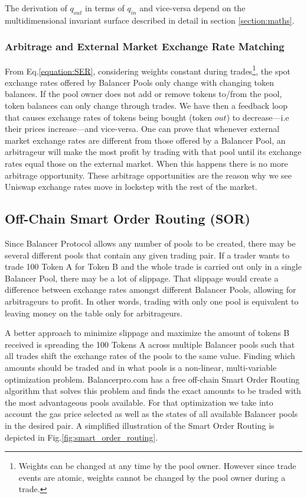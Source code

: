 \documentclass[11pt]{amsart}
\begin{document}
The derivation of $q_{out}$ in terms of $q_{in}$ and vice-versa depend on the multidimensional invariant surface described in detail in section \ref{section:maths}.

\subsubsection{Arbitrage and External Market Exchange Rate Matching}
From Eq.\ref{equation:SER}, considering weights constant during trades\footnote{Weights can be changed at any time by the pool owner. However since trade events are atomic, weights cannot be changed by the pool owner during a trade.}, the spot exchange rates offered by Balancer Pools only change with changing token balances. If the pool owner does not add or remove tokens to/from the pool, token balances can only change through trades. We have then a feedback loop that causes exchange rates of tokens being bought (token $out$) to decrease---i.e their prices increase---and vice-versa. One can prove that whenever external market exchange rates are different from those offered by a Balancer Pool, an arbitrageur will make the most profit by trading with that pool until its exchange rates equal those on the external market. When this happens there is no more arbitrage opportunity. These arbitrage opportunities are the reason why we see Uniswap exchange rates move in lockstep with the rest of the market. 

\subsection{Off-Chain Smart Order Routing (SOR)}
Since Balancer Protocol allows any number of pools to be created, there may be several different pools that contain any given trading pair. If a trader wants to trade 100 Token A for Token B and the whole trade is carried out only in a single Balancer Pool, there may be a lot of slippage. That slippage would create a difference between exchange rates amongst different Balancer Pools, allowing for arbitrageurs to profit. In other words, trading with only one pool is equivalent to leaving money on the table only for arbitrageurs. 

A better approach to minimize slippage and maximize the amount of tokens B received is spreading the 100 Tokens A across multiple Balancer pools such that all trades shift the exchange rates of the pools to the same value. Finding which amounts should be traded and in what pools is a non-linear, multi-variable optimization problem. Balancerpro.com has a free off-chain Smart Order Routing algorithm that solves this problem and finds the exact amounts to be traded with the most advantageous pools available. For that optimization we take into account the gas price selected as well as the states of all available Balancer pools in the desired pair. A simplified illustration of the Smart Order Routing is depicted in Fig.\ref{fig:smart_order_routing}.
\end{document}
